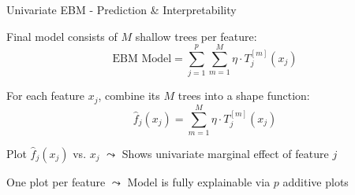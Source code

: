 \documentclass[10pt,compress,t,notes=noshow, xcolor=table]{beamer}
\begin{document}





\begin{framev}[align=top]{Univariate EBM - Prediction \& Interpretability}
\begin{itemizeM}
\item Final model consists of $M$ shallow trees per feature:
$$
\text{EBM Model} = \sum_{j=1}^p \sum_{m=1}^M \eta \cdot T_j^{[m]}(x_j)
$$
\item For each feature $x_j$, combine its $M$ trees into a shape function:
$$
\hat{f}_j(x_j) = \sum_{m=1}^M \eta \cdot T_j^{[m]}(x_j)
$$
\item Plot $\hat{f}_j(x_j)$ vs. $x_j$ $\leadsto$ Shows univariate marginal effect of feature $j$
\item One plot per feature $\leadsto$ Model is fully explainable via $p$ additive plots
\end{itemizeM}
\spacer[0.25]
\end{framev}
\end{document}
